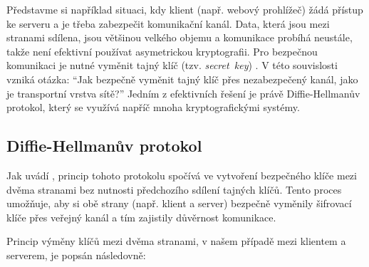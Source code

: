 Představme si například situaci, kdy klient (např. webový prohlížeč) žádá přístup ke serveru a je třeba zabezpečit komunikační kanál. Data, která jsou mezi stranami sdílena, jsou většinou velkého objemu a komunikace probíhá neustále, takže není efektivní používat asymetrickou kryptografii. Pro bezpečnou komunikaci je nutné vyměnit tajný klíč (tzv. \emph{secret~key}) \textcite{wikijs2024}. V této souvislosti vzniká otázka: \enquote{Jak bezpečně vyměnit tajný klíč přes nezabezpečený kanál, jako je transportní vrstva sítě?} Jedním z efektivních řešení je právě \mbox{Diffie-Hellmanův} protokol, který se využívá napříč mnoha kryptografickými systémy.

\subsection{Diffie-Hellmanův protokol}
\label{sec:diffie-hellman}

Jak uvádí \textcite{diffie1976}, princip tohoto protokolu spočívá ve vytvoření bezpečného klíče mezi dvěma stranami bez nutnosti předchozího sdílení tajných klíčů. Tento proces umožňuje, aby si obě strany (např. klient a server) bezpečně vyměnily šifrovací klíče přes veřejný kanál a tím zajistily důvěrnost komunikace.

Princip výměny klíčů mezi dvěma stranami, v našem případě mezi klientem a \mbox{serverem}, je popsán následovně:

